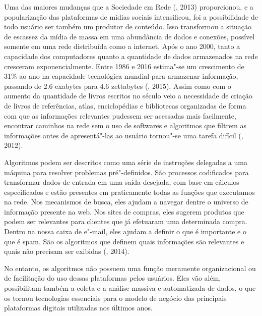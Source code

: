 Uma das maiores mudanças que a Sociedade em Rede (, 2013)
proporcionou, e a popularização das plataformas de mídias sociais
intensificou, foi a possibilidade de todo usuário ser também um produtor
de conteúdo. Isso transformou a situação de escassez da mídia de massa
em uma abundância de dados e conexões, possível somente em uma rede
distribuída como a internet. Após o ano 2000, tanto a capacidade dos
computadores quanto a quantidade de dados armazenados na rede
cresceram exponencialmente. Entre 1986 e 2016 estima"-se um crescimento de
31\% ao ano na capacidade tecnológica mundial para armazenar informação,
passando de 2.6 exabytes para 4.6 zettabytes (, 2015). Assim como
com o aumento da quantidade de livros escritos no século  veio a
necessidade de criação de livros de referências, atlas, enciclopédias e
bibliotecas organizadas de forma com que as informações relevantes
pudessem ser acessadas mais facilmente, encontrar caminhos na rede sem o
uso de softwares e algoritmos que filtrem as informações antes de
apresentá"-las ao usuário tornou"-se uma tarefa difícil (, 2012).

Algoritmos podem ser descritos como uma série de instruções delegadas a
uma máquina para resolver problemas pré"-definidos. São processos
codificados para transformar dados de entrada em uma saída desejada, com
base em cálculos especificados e estão presentes em praticamente todas
as funções que executamos na rede. Nos mecanismos de busca, eles ajudam
a navegar dentre o universo de informação presente na web. Nos sites de
compras, eles sugerem produtos que podem ser relevantes para clientes
que já efetuaram uma determinada compra. Dentro na nossa caixa de
e"-mail, eles ajudam a definir o que é importante e o que é spam. São os
algoritmos que definem quais informações são relevantes e quais não
precisam ser exibidas (, 2014).

No entanto, os algoritmos não possuem uma função meramente
organizacional ou de facilitação do uso dessas plataformas pelos
usuários. Eles vão além, possibilitam também a coleta e a análise
massiva e automatizada de dados, o que os tornou tecnologias essenciais
para o modelo de negócio das principais plataformas digitais utilizadas
nos últimos anos.

